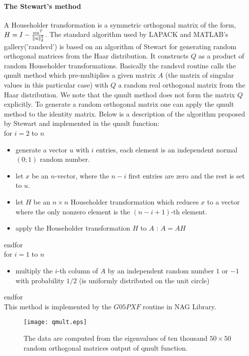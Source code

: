 \documentclass[a4paper]{article}
\newcommand\norm[1]{\lVert#1\rVert}
\begin{document}
\paragraph{The Stewart's method \\}
A Householder transformation is a symmetric orthogonal matrix of the form,\\
$H = I - {{uu^T} \over { \norm{u}_2^2}}$.
The standard algorithm used by LAPACK and MATLAB's gallery('randsvd') is based on an algorithm of 
Stewart \cite{stewart1980efficient} for generating random orthogonal matrices from the Haar distribution. 
It constructs $Q$ as a product of random Householder transformations. Basically the randsvd routine calls the 
qmult method which pre-multiplies a given matrix $A$ (the matrix of singular values in this particular case) with $Q$ 
a random real orthogonal matrix from the Haar distribution. We note that the qmult method does not form the matrix $Q$ 
explicitly. To generate a random orthogonal matrix one can apply the qmult method to the identity matrix.
Below is a description of the algorithm proposed by Stewart and implemented in the qmult function:\\
for $i = 2$ to $n$
\begin{itemize}
\item generate a vector $u$ with $i$ entries, each element is an independent normal $(0; 1)$
random number.
\item let $x$ be an $n$-vector, where the $n-i$ first entries are zero and the rest is set to $u$.
\item let $H$ be an $n \times n$ Householder transformation which reduces $x$ to a vector where
the only nonzero element is the $(n-i+1)$-th element.
\item apply the Householder transformation $H$ to $A$ : $A =  A H$
\end{itemize}
endfor\\
for $i = 1$ to $n$
\begin{itemize}
\item multiply the $i$-th column of $A$ by an independent random number $1$ or $-1$ with probability $1/2$ (is uniformly distributed on the unit circle)
\end{itemize}
endfor \\

This method is implemented by the $G05PXF$ routine in NAG Library. \\

\begin{figure}[!htb]
\texttt{[image: qmult.eps]}
\caption{The data are computed from the eigenvalues of ten thousand 
$50\times 50$ random orthogonal matrices output of qmult function.}
\label{fig:qmult}
\end{figure}
\end{document}
